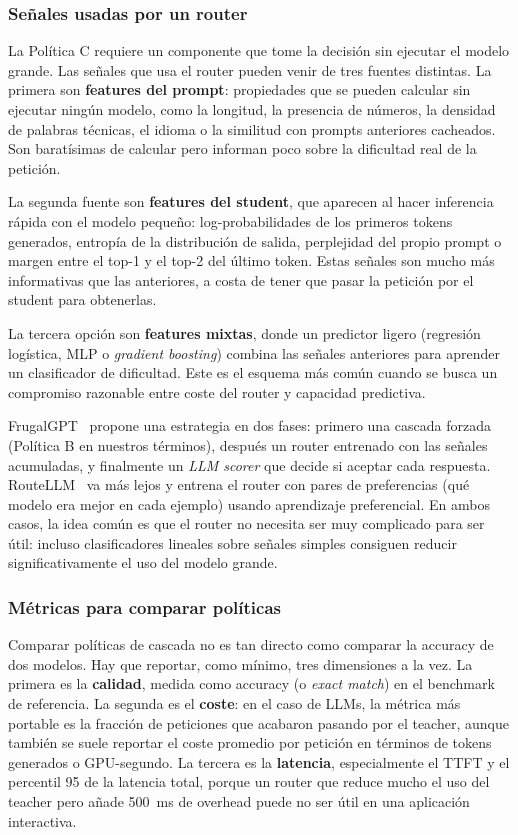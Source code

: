 \documentclass[11pt,a4paper]{article}
\begin{document}
\subsubsection{Señales usadas por un router}

La Política C requiere un componente que tome la decisión sin ejecutar el modelo grande. Las señales que usa el router pueden venir de tres fuentes distintas. La primera son \textbf{features del prompt}: propiedades que se pueden calcular sin ejecutar ningún modelo, como la longitud, la presencia de números, la densidad de palabras técnicas, el idioma o la similitud con prompts anteriores cacheados. Son baratísimas de calcular pero informan poco sobre la dificultad real de la petición.

La segunda fuente son \textbf{features del student}, que aparecen al hacer inferencia rápida con el modelo pequeño: log-probabilidades de los primeros tokens generados, entropía de la distribución de salida, perplejidad del propio prompt o margen entre el top-1 y el top-2 del último token. Estas señales son mucho más informativas que las anteriores, a costa de tener que pasar la petición por el student para obtenerlas.

La tercera opción son \textbf{features mixtas}, donde un predictor ligero (regresión logística, MLP o \textit{gradient boosting}) combina las señales anteriores para aprender un clasificador de dificultad. Este es el esquema más común cuando se busca un compromiso razonable entre coste del router y capacidad predictiva.

FrugalGPT~\cite{chen2023frugalgpt} propone una estrategia en dos fases: primero una cascada forzada (Política B en nuestros términos), después un router entrenado con las señales acumuladas, y finalmente un \textit{LLM scorer} que decide si aceptar cada respuesta. RouteLLM~\cite{dekoninck2024routing} va más lejos y entrena el router con pares de preferencias (qué modelo era mejor en cada ejemplo) usando aprendizaje preferencial. En ambos casos, la idea común es que el router no necesita ser muy complicado para ser útil: incluso clasificadores lineales sobre señales simples consiguen reducir significativamente el uso del modelo grande.

\subsubsection{Métricas para comparar políticas}

Comparar políticas de cascada no es tan directo como comparar la accuracy de dos modelos. Hay que reportar, como mínimo, tres dimensiones a la vez. La primera es la \textbf{calidad}, medida como accuracy (o \textit{exact match}) en el benchmark de referencia. La segunda es el \textbf{coste}: en el caso de LLMs, la métrica más portable es la fracción de peticiones que acabaron pasando por el teacher, aunque también se suele reportar el coste promedio por petición en términos de tokens generados o GPU-segundo. La tercera es la \textbf{latencia}, especialmente el TTFT y el percentil 95 de la latencia total, porque un router que reduce mucho el uso del teacher pero añade 500~ms de overhead puede no ser útil en una aplicación interactiva.
\end{document}
